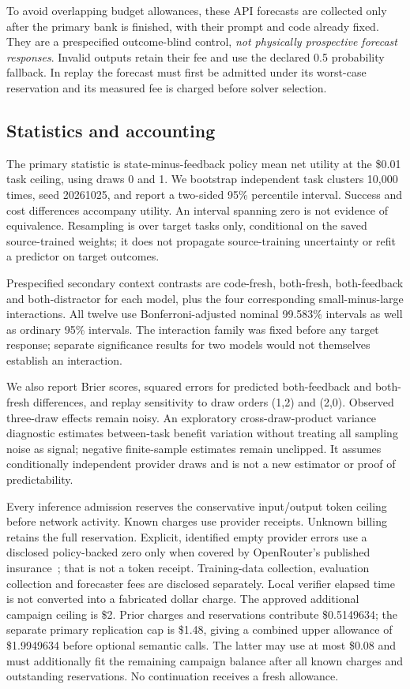 \documentclass[10pt,twocolumn]{article}
\begin{document}
To avoid overlapping budget allowances, these API forecasts are collected only
after the primary bank is finished, with their prompt and code already fixed.
They are a prespecified outcome-blind control, \emph{not physically prospective
forecast responses}. Invalid outputs retain their fee and use the declared
0.5 probability fallback. In replay the forecast must first be admitted under
its worst-case reservation and its measured fee is charged before solver
selection.

\subsection{Statistics and accounting}

The primary statistic is state-minus-feedback policy mean net utility at the
\$0.01 task ceiling, using draws 0 and 1. We bootstrap independent task clusters
10,000 times, seed 20261025, and report a two-sided 95\% percentile interval.
Success and cost differences accompany utility. An interval spanning zero is not
evidence of equivalence. Resampling is over target tasks only, conditional on
the saved source-trained weights; it does not propagate source-training
uncertainty or refit a predictor on target outcomes.

Prespecified secondary context contrasts are code-fresh, both-fresh,
both-feedback and both-distractor for each model, plus the four corresponding
small-minus-large interactions. All twelve use Bonferroni-adjusted nominal
99.583\% intervals as well as ordinary 95\% intervals. The interaction family was
fixed before any target response; separate significance results for two models
would not themselves establish an interaction.

We also report Brier scores, squared errors for predicted both-feedback and
both-fresh differences, and replay sensitivity to draw orders (1,2) and (2,0).
Observed three-draw effects remain noisy. An exploratory cross-draw-product
variance diagnostic estimates between-task benefit variation without treating
all sampling noise as signal; negative finite-sample estimates remain
unclipped. It assumes conditionally independent provider draws and is not a new
estimator or proof of predictability.

Every inference admission reserves the conservative input/output token ceiling
before network activity. Known charges use provider receipts. Unknown billing
retains the full reservation. Explicit, identified empty provider errors use a
disclosed policy-backed zero only when covered by OpenRouter's published
insurance~\cite{openrouter}; that is not a token receipt. Training-data collection,
evaluation collection and forecaster fees are disclosed separately. Local
verifier elapsed time is not converted into a fabricated dollar charge.
The approved additional campaign ceiling is \$2. Prior charges and reservations
contribute \$0.5149634; the separate primary replication cap is \$1.48, giving a
combined upper allowance of \$1.9949634 before optional semantic calls. The latter
may use at most \$0.08 and must additionally fit the remaining campaign balance
after all known charges and outstanding reservations. No continuation receives
a fresh allowance.
\end{document}
